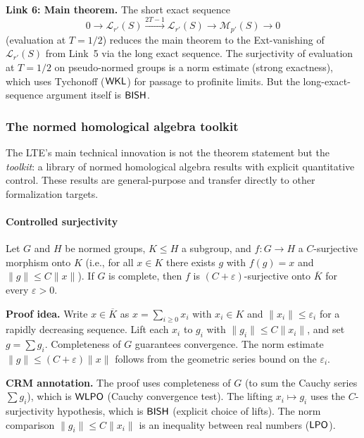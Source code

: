 \medskip
\noindent\textbf{Link 6: Main theorem.}
The short exact sequence
\[
  0 \longrightarrow \mathcal{L}_{r'}(S) \xrightarrow{2T-1}
  \mathcal{L}_{r'}(S) \longrightarrow
  \mathcal{M}_{p'}(S) \longrightarrow 0
\]
(evaluation at $T = 1/2$) reduces the main theorem to the Ext-vanishing
of $\mathcal{L}_{r'}(S)$ from Link~5 via the long exact sequence.
The surjectivity of evaluation at $T = 1/2$ on pseudo-normed groups
is a norm estimate (strong exactness), which uses
Tychonoff ($\textsf{WKL}$) for passage to profinite limits.  But the
long-exact-sequence argument itself is $\textsf{BISH}$.


\subsubsection{The normed homological algebra toolkit}\label{sec:toolkit}

The LTE's main technical innovation is not the theorem statement
but the \emph{toolkit}: a library of normed homological algebra
results with explicit quantitative control.  These results are
general-purpose and transfer directly to other formalization targets.

\paragraph{Controlled surjectivity}

\begin{lemma}
\label{lem:closure-surj}
Let $G$ and $H$ be normed groups, $K \leq H$ a subgroup, and
$f: G \to H$ a $C$-surjective morphism onto $K$ (i.e., for all
$x \in K$ there exists $g$ with $f(g) = x$ and
$\|g\| \leq C\|x\|$).  If $G$ is complete, then $f$ is
$(C+\varepsilon)$-surjective onto $\overline{K}$ for every
$\varepsilon > 0$.
\end{lemma}

\noindent\textbf{Proof idea.}
Write $x \in \overline{K}$ as $x = \sum_{i \geq 0} x_i$ with
$x_i \in K$ and $\|x_i\| \leq \varepsilon_i$ for a rapidly
decreasing sequence.  Lift each $x_i$ to $g_i$ with
$\|g_i\| \leq C\|x_i\|$, and set $g = \sum g_i$.  Completeness
of $G$ guarantees convergence.  The norm estimate
$\|g\| \leq (C+\varepsilon)\|x\|$ follows from the geometric
series bound on the $\varepsilon_i$.

\medskip
\noindent\textbf{CRM annotation.}
The proof uses completeness of $G$ (to sum the Cauchy series
$\sum g_i$), which is $\textsf{WLPO}$ (Cauchy convergence test).  The
lifting $x_i \mapsto g_i$ uses the $C$-surjectivity hypothesis,
which is $\textsf{BISH}$ (explicit choice of lifts).  The norm comparison
$\|g_i\| \leq C\|x_i\|$ is an inequality between real numbers
($\textsf{LPO}$).

